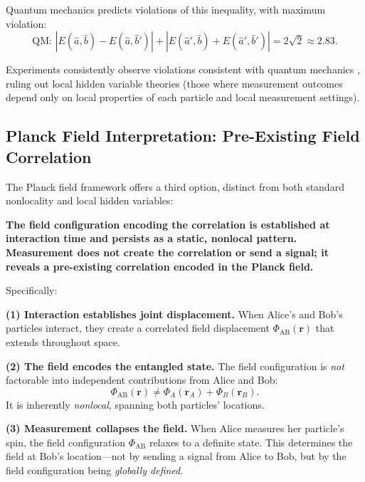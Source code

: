 \documentclass[11pt,a4paper]{article}
\theoremstyle{definition}
\theoremstyle{remark}
\begin{document}
Quantum mechanics predicts violations of this inequality, with maximum violation:
\begin{equation}
\label{eq:bell_violation}
\text{QM: } |E(\hat{a},\hat{b}) - E(\hat{a},\hat{b}')| + |E(\hat{a}',\hat{b}) + E(\hat{a}',\hat{b}')| = 2\sqrt{2} \approx 2.83.
\end{equation}

Experiments consistently observe violations consistent with quantum mechanics \cite{Aspect1982,Weihs1998,Hensen2015}, ruling out local hidden variable theories (those where measurement outcomes depend only on local properties of each particle and local measurement settings).

\subsection{Planck Field Interpretation: Pre-Existing Field Correlation}
\label{sec:planck_interpretation}

The Planck field framework offers a third option, distinct from both standard nonlocality and local hidden variables:

\textbf{The field configuration encoding the correlation is established at interaction time and persists as a static, nonlocal pattern. Measurement does not create the correlation or send a signal; it reveals a pre-existing correlation encoded in the Planck field.}

Specifically:

\textbf{(1) Interaction establishes joint displacement.} When Alice's and Bob's particles interact, they create a correlated field displacement $\Phi_{\mathrm{AB}}(\mathbf{r})$ that extends throughout space.

\textbf{(2) The field encodes the entangled state.} The field configuration is \emph{not} factorable into independent contributions from Alice and Bob:
\begin{equation}
\label{eq:field_nonfactorable}
\Phi_{\mathrm{AB}}(\mathbf{r}) \neq \Phi_A(\mathbf{r}_A) + \Phi_B(\mathbf{r}_B).
\end{equation}
It is inherently \emph{nonlocal}, spanning both particles' locations.

\textbf{(3) Measurement collapses the field.} When Alice measures her particle's spin, the field configuration $\Phi_{\mathrm{AB}}$ relaxes to a definite state. This determines the field at Bob's location---not by sending a signal from Alice to Bob, but by the field configuration being \emph{globally defined}.
\end{document}
